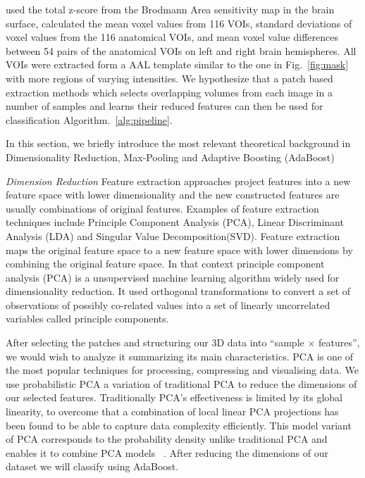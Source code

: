 \documentclass[authoryear,preprint,revi	ew,12pt]{elsarticle}
\begin{document}
\citep{kakimoto2011new} used the total z-score from the Brodmann Area sensitivity map in the brain surface,  \citep{lu2017early} calculated the mean voxel values from 116 VOIs, standard deviations of voxel values from the 116 anatomical VOIs, and mean voxel value differences between 54 pairs of the anatomical VOIs on left and right brain hemispheres. All VOIs were extracted form a AAL template similar to the one in Fig.~\ref{fig:mask} with more regions of varying intensities. We hypothesize that a patch based extraction methods which selects overlapping volumes from each image in a number of samples and learns their reduced features can then be used for classification Algorithm.~\ref{alg:pipeline}.  

In this section, we briefly introduce the most relevant theoretical background in Dimensionality Reduction, Max-Pooling and Adaptive Boosting (AdaBoost)   

\textit{Dimension Reduction}
Feature extraction approaches project features into a new feature space with lower dimensionality and the new constructed features are usually combinations of original features. Examples of feature extraction techniques include Principle Component Analysis (PCA), Linear Discriminant Analysis (LDA) and Singular Value Decomposition(SVD). Feature extraction maps the original feature space to a new feature space with lower dimensions by combining the original feature space. In that context principle component analysis (PCA) \citep{jolliffe2002principal} is a unsupervised machine learning algorithm widely used for dimensionality reduction. It used orthogonal transformations to convert a set of observations of possibly co-related values into a set of linearly uncorrelated variables called principle components. 

After selecting the patches and structuring our 3D data into ``sample $ \times $ features'', we would wish to analyze it summarizing its main characteristics. PCA is one of the most popular techniques for processing, compressing and visualising data. We use probabilistic PCA a variation of traditional PCA to reduce the dimensions of our selected features. Traditionally PCA's effectiveness is limited by its global linearity, to overcome that a combination of local linear PCA projections has been found to be able to capture data complexity efficiently. This model variant of PCA corresponds to the probability density unlike traditional PCA and enables it to combine PCA models~ \citep{tipping1999mixtures}. After reducing the dimensions of our dataset we will classify using AdaBoost. 
\end{document}
